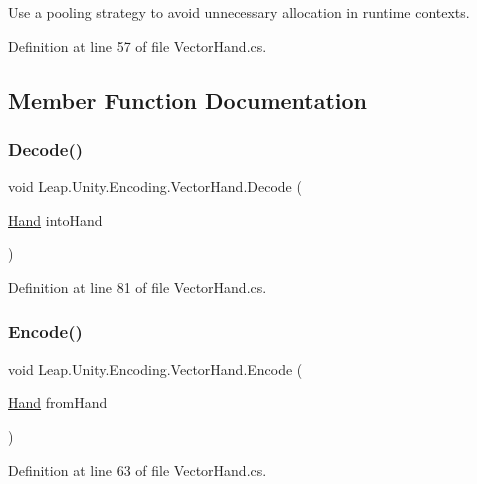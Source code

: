 Use a pooling strategy to avoid unnecessary allocation in runtime contexts. 

Definition at line 57 of file Vector\+Hand.\+cs.



\subsection{Member Function Documentation}
\mbox{\label{class_leap_1_1_unity_1_1_encoding_1_1_vector_hand_ae9ced40bf71da643264a1b750bd52e35}} 
\subsubsection{\texorpdfstring{Decode()}{Decode()}}
{\footnotesize\ttfamily void Leap.\+Unity.\+Encoding.\+Vector\+Hand.\+Decode (\begin{DoxyParamCaption}\item[{\mbox{\hyperlink{class_leap_1_1_hand}{Hand}}}]{into\+Hand }\end{DoxyParamCaption})}



Definition at line 81 of file Vector\+Hand.\+cs.

\mbox{\label{class_leap_1_1_unity_1_1_encoding_1_1_vector_hand_aa949217613221d04f753a3df29c5dd75}} 
\subsubsection{\texorpdfstring{Encode()}{Encode()}}
{\footnotesize\ttfamily void Leap.\+Unity.\+Encoding.\+Vector\+Hand.\+Encode (\begin{DoxyParamCaption}\item[{\mbox{\hyperlink{class_leap_1_1_hand}{Hand}}}]{from\+Hand }\end{DoxyParamCaption})}



Definition at line 63 of file Vector\+Hand.\+cs.

\mbox{\label{class_leap_1_1_unity_1_1_encoding_1_1_vector_hand_a05ef96613b46f48f93ac66fe23294b23}} 
